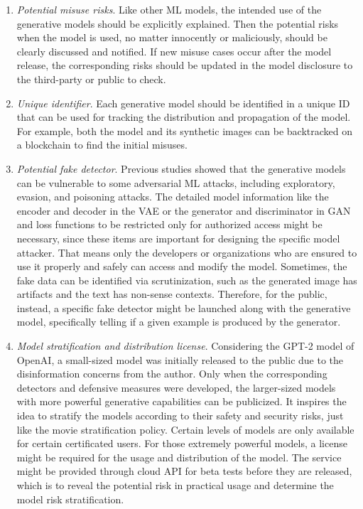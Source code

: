 \documentclass[conference]{IEEEtran}
\begin{document}
\begin{enumerate}
    \item \textit{Potential misuse risks}. Like other ML models, the intended use of the generative models should be explicitly explained. Then the potential risks when the model is used, no matter innocently or maliciously, should be clearly discussed and notified. If new misuse cases occur after the model release, the corresponding risks should be updated in the model disclosure to the third-party or public to check.
    \item \textit{Unique identifier}. Each generative model should be identified in a unique ID that can be used for tracking the distribution and propagation of the model. 
    For example, both the model and its synthetic images can be backtracked on a blockchain to find the initial misuses.
    \item \textit{Potential fake detector}. Previous studies showed that the generative models can be vulnerable to
    some adversarial ML attacks, including exploratory, evasion, and poisoning attacks\cite{b4}. 
    The detailed model information like the encoder and decoder in the VAE or the generator and discriminator in GAN and loss functions to be restricted only for authorized access might be necessary, since these items are important for designing the specific model attacker.
    That means only the developers or organizations who are ensured to use it properly and safely can access and modify the model.
    Sometimes, the fake data can be identified via scrutinization, such as the generated image has artifacts and the text has non-sense contexts. Therefore, for the public, instead, a specific fake detector might be launched along with the generative model, specifically telling if a given example is produced by the generator.
    \item \textit{Model stratification and distribution license}. Considering the GPT-2 model of OpenAI, a small-sized model was initially released to the public due to the disinformation concerns from the author. 
    Only when the corresponding detectors and defensive measures were developed, the larger-sized models with more powerful generative capabilities can be publicized. 
    It inspires the idea to stratify the models according to their safety and security risks, just like the movie stratification policy. Certain levels of models are only available for certain certificated users. 
    For those extremely powerful models, a license might be required for the usage and distribution of the model. 
    The service might be provided through cloud API for beta tests before they are released, which is to reveal the potential risk in practical usage and determine the model risk stratification. 
\end{enumerate}
\end{document}
